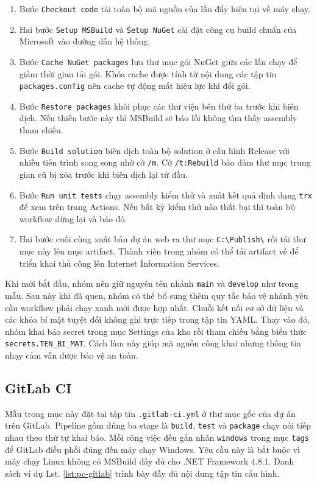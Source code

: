 \begin{enumerate}
\item Bước \verb|Checkout code| tải toàn bộ mã nguồn của lần đẩy hiện tại về máy chạy.
\item Hai bước \verb|Setup MSBuild| và \verb|Setup NuGet| cài đặt công cụ build chuẩn của Microsoft vào đường dẫn hệ thống.
\item Bước \verb|Cache NuGet packages| lưu thư mục gói NuGet giữa các lần chạy để giảm thời gian tải gói.
Khóa cache được tính từ nội dung các tập tin \verb|packages.config| nên cache tự động mất hiệu lực khi đổi gói.
\item Bước \verb|Restore packages| khôi phục các thư viện bên thứ ba trước khi biên dịch.
Nếu thiếu bước này thì MSBuild sẽ báo lỗi không tìm thấy assembly tham chiếu.
\item Bước \verb|Build solution| biên dịch toàn bộ solution ở cấu hình Release với nhiều tiến trình song song nhờ cờ \verb|/m|.
Cờ \verb|/t:Rebuild| bảo đảm thư mục trung gian cũ bị xóa trước khi biên dịch lại từ đầu.
\item Bước \verb|Run unit tests| chạy assembly kiểm thử và xuất kết quả định dạng \verb|trx| để xem trên trang Actions.
Nếu bất kỳ kiểm thử nào thất bại thì toàn bộ workflow dừng lại và báo đỏ.
\item Hai bước cuối cùng xuất bản dự án web ra thư mục \verb|C:\Publish\| rồi tải thư mục này lên mục artifact.
Thành viên trong nhóm có thể tải artifact về để triển khai thủ công lên Internet Information Services.
\end{enumerate}

Khi mới bắt đầu, nhóm nên giữ nguyên tên nhánh \verb|main| và \verb|develop| như trong mẫu.
Sau này khi đã quen, nhóm có thể bổ sung thêm quy tắc bảo vệ nhánh yêu cầu workflow phải chạy xanh mới được hợp nhất.
Chuỗi kết nối cơ sở dữ liệu và các khóa bí mật tuyệt đối không ghi trực tiếp trong tập tin YAML.
Thay vào đó, nhóm khai báo secret trong mục Settings của kho rồi tham chiếu bằng biểu thức \verb|secrets.TEN_BI_MAT|.
Cách làm này giúp mã nguồn công khai nhưng thông tin nhạy cảm vẫn được bảo vệ an toàn.

\subsection{GitLab CI}
\label{subsec:pc-gitlab}

Mẫu trong mục này đặt tại tập tin \verb|.gitlab-ci.yml| ở thư mục gốc của dự án trên GitLab.
Pipeline gồm đúng ba stage là \verb|build|, \verb|test| và \verb|package| chạy nối tiếp nhau theo thứ tự khai báo.
Mỗi công việc đều gắn nhãn \verb|windows| trong mục \verb|tags| để GitLab điều phối đúng đến máy chạy Windows.
Yêu cầu này là bắt buộc vì máy chạy Linux không có MSBuild đầy đủ cho .NET Framework 4.8.1.
Danh sách ví dụ Lst. \ref{lst:pc-gitlab} trình bày đầy đủ nội dung tập tin cấu hình.


